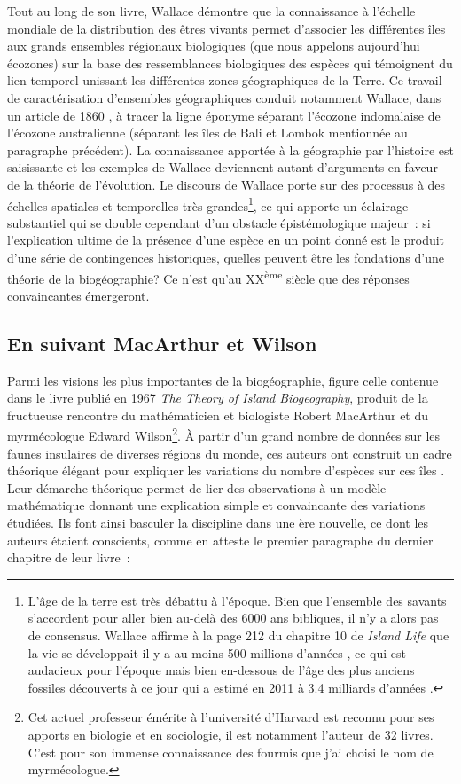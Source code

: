 Tout au long de son livre, Wallace démontre que la connaissance à
l'échelle mondiale de la distribution des êtres vivants permet
d'associer les différentes îles aux grands ensembles régionaux
biologiques (que nous appelons aujourd'hui écozones) sur la base des
ressemblances biologiques des espèces qui témoignent du lien temporel
unissant les différentes zones géographiques de la Terre. Ce travail de
caractérisation d'ensembles géographiques conduit notamment Wallace,
dans un article de 1860 \citep{Wallace1860}, à tracer la ligne éponyme
séparant l'écozone indomalaise de l'écozone australienne (séparant les
îles de Bali et Lombok mentionnée au paragraphe précédent). La
connaissance apportée à la géographie par l'histoire est saisissante et
les exemples de Wallace deviennent autant d'arguments en faveur de la
théorie de l'évolution. Le discours de Wallace porte sur des processus à
des échelles spatiales et temporelles très grandes\footnote{L'âge de la
  terre est très débattu à l'époque. Bien que l'ensemble des savants
  s'accordent pour aller bien au-delà des 6000 ans bibliques, il n'y a
  alors pas de consensus. Wallace affirme à la page 212 du chapitre 10
  de \emph{Island Life} que la vie se développait il y a au moins 500
  millions d'années \citep{wallace1881island}, ce qui est audacieux pour
  l'époque mais bien en-dessous de l'âge des plus anciens fossiles
  découverts à ce jour qui a estimé en 2011 à 3.4 milliards d'années
  \citep{Wacey2011}.}, ce qui apporte un éclairage substantiel qui se
double cependant d'un obstacle épistémologique majeur~: si l'explication
ultime de la présence d'une espèce en un point donné est le produit
d'une série de contingences historiques, quelles peuvent être les
fondations d'une théorie de la biogéographie? Ce n'est qu'au
XX\textsuperscript{ème} siècle que des réponses convaincantes
émergeront.

\subsection*{En suivant MacArthur et
Wilson}\label{en-suivant-macarthur-et-wilson}

Parmi les visions les plus importantes de la biogéographie, figure celle
contenue dans le livre publié en 1967 \emph{The Theory of Island
Biogeography}, produit de la fructueuse rencontre du mathématicien et
biologiste Robert MacArthur et du myrmécologue Edward Wilson\footnote{Cet
  actuel professeur émérite à l'université d'Harvard est reconnu pour
  ses apports en biologie et en sociologie, il est notamment l'auteur de
  32 livres. C'est pour son immense connaissance des fourmis que j'ai
  choisi le nom de myrmécologue.}. À partir d'un grand nombre de données
sur les faunes insulaires de diverses régions du monde, ces auteurs ont
construit un cadre théorique élégant pour expliquer les variations du
nombre d'espèces sur ces îles \citep{MacArthur1967}. Leur démarche
théorique permet de lier des observations à un modèle mathématique
donnant une explication simple et convaincante des variations étudiées.
Ils font ainsi basculer la discipline dans une ère nouvelle, ce dont les
auteurs étaient conscients, comme en atteste le premier paragraphe du
dernier chapitre de leur livre~:

